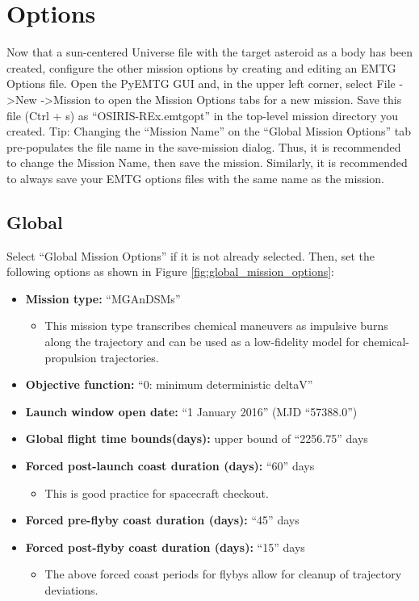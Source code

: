 \documentclass[11pt]{article}
\begin{document}
\section{Options}
\label{sec:options}

Now that a sun-centered Universe file with the target asteroid as a body has been created, configure the other mission options by creating and editing an \ac{EMTG} Options file. Open the PyEMTG \ac{GUI} and, in the upper left corner, select File -\textgreater New -\textgreater Mission to open the Mission Options tabs for a new mission. Save this file (Ctrl + s)  as ``OSIRIS-REx.emtgopt'' in the top-level mission directory you created. Tip: Changing the ``Mission Name'' on the ``Global Mission Options'' tab pre-populates the file name in the save-mission dialog. Thus, it is recommended to change the Mission Name, then save the mission. Similarly, it is recommended to always save your \ac{EMTG} options files with the same name as the mission.

\subsection{Global}
\label{sec:global}

Select ``Global Mission Options'' if it is not already selected. Then, set the following options as shown in Figure \ref{fig:global_mission_options}:

\begin{itemize}
	\item \textbf{Mission type:} ``\acs{MGAnDSMs}''
	\begin{itemize}
		\item This mission type transcribes chemical maneuvers as impulsive burns along the trajectory and can be used as a low-fidelity model for chemical-propulsion trajectories.
	\end{itemize}
	\item \textbf{Objective function:} ``0: minimum deterministic deltaV''
	\item \textbf{Launch window open date:} ``1 January 2016'' (MJD ``57388.0'')
	\item \textbf{Global flight time bounds(days):} upper bound of ``2256.75'' days
	\item \textbf{Forced post-launch coast duration (days):} ``60'' days
	\begin{itemize}
		\item This is good practice for spacecraft checkout.
	\end{itemize}
	\item \textbf{Forced pre-flyby coast duration (days):} ``45'' days
	\item \textbf{Forced post-flyby coast duration (days):} ``15'' days
	\begin{itemize}
		\item The above forced coast periods for flybys allow for cleanup of trajectory deviations.
	\end{itemize}
\end{itemize}
\end{document}
